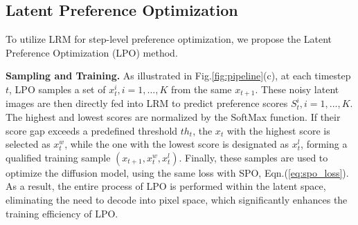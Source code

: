 \begin{table}[t]
    \centering
    \vspace{-2.5mm}
    \caption{Explored data filter strategies of Pick-a-Pic.}
    \vskip 0.05in
    \label{tab:filter}
    \centering
    \scriptsize
    \vskip -0.15in
\end{table}

\subsection{Latent Preference Optimization}
\label{sec:lpo}

To utilize LRM for step-level preference optimization, we propose the Latent Preference Optimization (LPO) method.

\textbf{Sampling and Training.}  As illustrated in Fig.\;\ref{fig:pipeline}\;(c), at each timestep $t$, LPO samples a set of $x^i_{t},i=1,...,K$ from the same $x_{t+1}$. These noisy latent images are then directly fed into LRM to predict preference scores $S^i_{t},i=1,...,K$. The highest and lowest scores are normalized by the SoftMax function. If their score gap exceeds a predefined threshold $th_{t}$, the $x_{t}$ with the highest score is selected as $x_{t}^w$, while the one with the lowest score is designated as $x_{t}^l$, forming a qualified training sample $(x_{t+1},x_{t}^w,x_{t}^l)$. Finally, these samples are used to optimize the diffusion model, using the same loss with SPO, \ie Eqn.\;(\ref{eq:spo_loss}). As a result, the entire process of LPO is performed within the latent space, eliminating the need to decode into pixel space, which significantly enhances the training efficiency of LPO.

